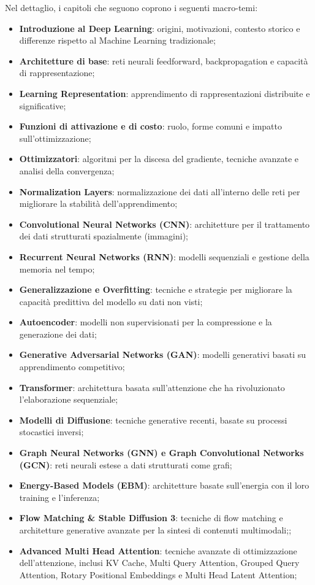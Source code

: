 Nel dettaglio, i capitoli che seguono coprono i seguenti macro-temi:
\begin{itemize}
    \item \textbf{Introduzione al Deep Learning}: origini, motivazioni, contesto storico e differenze rispetto al Machine Learning tradizionale;
    \item \textbf{Architetture di base}: reti neurali feedforward, backpropagation e capacità di rappresentazione;
    \item \textbf{Learning Representation}: apprendimento di rappresentazioni distribuite e significative;
    \item \textbf{Funzioni di attivazione e di costo}: ruolo, forme comuni e impatto sull’ottimizzazione;
    \item \textbf{Ottimizzatori}: algoritmi per la discesa del gradiente, tecniche avanzate e analisi della convergenza;
    \item \textbf{Normalization Layers}: normalizzazione dei dati all’interno delle reti per migliorare la stabilità dell’apprendimento;
    \item \textbf{Convolutional Neural Networks (CNN)}: architetture per il trattamento dei dati strutturati spazialmente (immagini);
    \item\textbf{Recurrent Neural Networks (RNN)}: modelli sequenziali e gestione della memoria nel tempo;
    \item\textbf{Generalizzazione e Overfitting}: tecniche e strategie per migliorare la capacità predittiva del modello su dati non visti;
    \item\textbf{Autoencoder}: modelli non supervisionati per la compressione e la generazione dei dati;
    \item\textbf{Generative Adversarial Networks (GAN)}: modelli generativi basati su apprendimento competitivo;
    \item\textbf{Transformer}: architettura basata sull’attenzione che ha rivoluzionato l’elaborazione sequenziale;
    \item\textbf{Modelli di Diffusione}: tecniche generative recenti, basate su processi stocastici inversi;
    \item\textbf{Graph Neural Networks (GNN) e Graph Convolutional Networks (GCN)}: reti neurali estese a dati strutturati come grafi;
    \item\textbf{Energy-Based Models (EBM)}: architetture basate sull'energia con il loro training e l'inferenza;
    \item\textbf{Flow Matching \& Stable Diffusion 3}: tecniche di flow matching e architetture generative avanzate per la sintesi di contenuti multimodali;;
    \item\textbf{Advanced Multi Head Attention}: tecniche avanzate di ottimizzazione dell'attenzione, inclusi KV Cache, Multi Query Attention, Grouped Query Attention, Rotary Positional Embeddings e Multi Head Latent Attention;
\end{itemize}
